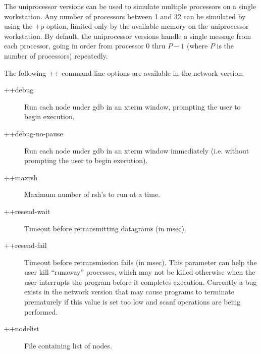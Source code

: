 \label{uniprocessor command line options}

The uniprocessor versions can be used to simulate multiple
processors on a single workstation.  Any number of processors between 1 and 32 can be simulated by
using the {\fexec +p} option, limited only by the available memory on the
uniprocessor workstation.  By default, the uniprocessor versions handle
a single message from each processor, going in order from processor 0
thru $P-1$ (where $P$ is the number of processors) repeatedly.  

\label{network command line options}

The following {\fexec ++} command line options are available in
the network version:
\begin{description}

\item[{\fexec ++debug}] Run each node under gdb in an xterm window, prompting
the user to begin execution.

\item[{\fexec ++debug-no-pause}] Run each node under gdb in an xterm window
immediately (i.e. without prompting the user to begin execution).

\item[{\fexec ++maxrsh}] Maximum number of {\fcmd rsh}'s to run at a
time.

\item[{\fexec ++resend-wait}] Timeout before retransmitting datagrams
(in msec).

\item[{\fexec ++resend-fail}] Timeout before retransmission fails (in
msec).
This parameter can help the user kill ``runaway'' processes, which may not
be killed otherwise when the user interrupts the program before it 
completes execution.
Currently a bug exists in the network version that may cause programs to
terminate prematurely if this value is set too low and {\fexec scanf} 
operations are being performed.

\item[{\fexec ++nodelist}] File containing list of nodes.

\end{description}


